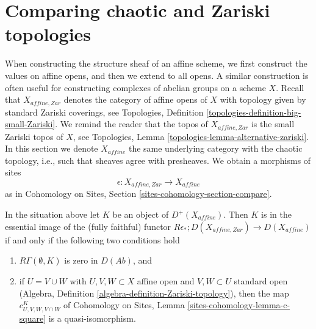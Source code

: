 \section{Comparing chaotic and Zariski topologies}
\label{section-compare-chaotic-Zariski}

\noindent
When constructing the structure sheaf of an affine scheme, we first
construct the values on affine opens, and then we extend to all opens.
A similar construction is often useful for constructing complexes
of abelian groups on a scheme $X$. Recall that $X_{affine, Zar}$
denotes the category of affine opens of $X$ with topology given
by standard Zariski coverings, see
Topologies, Definition \ref{topologies-definition-big-small-Zariski}.
We remind the reader that the topos of $X_{affine, Zar}$
is the small Zariski topos of $X$, see Topologies, Lemma
\ref{topologies-lemma-alternative-zariski}.
In this section we denote $X_{affine}$ the same underlying
category with the chaotic topology, i.e., such that sheaves
agree with presheaves. We obtain a morphisms of sites
$$
\epsilon : X_{affine, Zar} \longrightarrow X_{affine}
$$
as in Cohomology on Sites, Section \ref{sites-cohomology-section-compare}.

\begin{lemma}
\label{lemma-check-zar}
In the situation above let $K$ be an object of $D^+(X_{affine})$.
Then $K$ is in the essential image of the (fully faithful) functor
$R\epsilon_* ; D(X_{affine, Zar}) \to D(X_{affine})$ if and only
if the following two conditions hold
\begin{enumerate}
\item $R\Gamma(\emptyset, K)$ is zero in $D(\textit{Ab})$, and
\item if $U = V \cup W$ with $U, V, W \subset X$ affine open and
$V, W \subset U$ standard open
(Algebra, Definition \ref{algebra-definition-Zariski-topology}), then
the map $c^K_{U, V, W, V \cap W}$ of
Cohomology on Sites, Lemma \ref{sites-cohomology-lemma-c-square}
is a quasi-isomorphism.
\end{enumerate}
\end{lemma}

